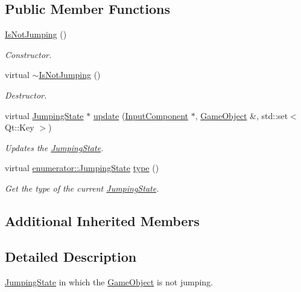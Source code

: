\subsection*{Public Member Functions}
\begin{DoxyCompactItemize}
\item 
\hyperlink{classIsNotJumping_a4944fdea4979abd38c5cdc7e6eb278ca}{Is\-Not\-Jumping} ()
\begin{DoxyCompactList}\small\item\em Constructor. \end{DoxyCompactList}\item 
\hypertarget{classIsNotJumping_a920891e2d40f4c8b485a857b6830c98c}{virtual \hyperlink{classIsNotJumping_a920891e2d40f4c8b485a857b6830c98c}{$\sim$\-Is\-Not\-Jumping} ()}\label{classIsNotJumping_a920891e2d40f4c8b485a857b6830c98c}

\begin{DoxyCompactList}\small\item\em Destructor. \end{DoxyCompactList}\item 
virtual \hyperlink{classJumpingState}{Jumping\-State} $\ast$ \hyperlink{classIsNotJumping_ae58898ada922fab24c37735bee506c8c}{update} (\hyperlink{classInputComponent}{Input\-Component} $\ast$, \hyperlink{classGameObject}{Game\-Object} \&, std\-::set$<$ Qt\-::\-Key $>$)
\begin{DoxyCompactList}\small\item\em Updates the \hyperlink{classJumpingState}{Jumping\-State}. \end{DoxyCompactList}\item 
virtual \hyperlink{namespaceenumerator_a2f1fb1ef7c57e4549f424d454c1e2179}{enumerator\-::\-Jumping\-State} \hyperlink{classIsNotJumping_a2fc57703b1017b434e82b4a054f2c9d1}{type} ()
\begin{DoxyCompactList}\small\item\em Get the type of the current \hyperlink{classJumpingState}{Jumping\-State}. \end{DoxyCompactList}\end{DoxyCompactItemize}
\subsection*{Additional Inherited Members}


\subsection{Detailed Description}
\hyperlink{classJumpingState}{Jumping\-State} in which the \hyperlink{classGameObject}{Game\-Object} is not jumping. 

